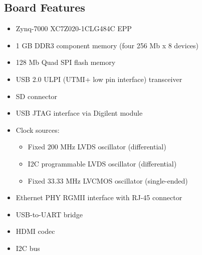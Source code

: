 \subsection{Board Features}
\label{zynq:features}
\nocite{Zynq7000:UserGuide}
\begin{itemize}
    \item Zynq-7000 XC7Z020-1CLG484C \gls{EPP}
    \item 1 GB \gls{DDR}3 component memory (four 256 Mb x 8 devices)
    \item 128 Mb Quad \gls{SPI} flash memory
    \item \gls{USB} 2.0 ULPI (UTMI+ low pin interface) transceiver
    \item \gls{SD} connector
    \item \gls{USB} \gls{JTAG} interface via Digilent module
    \item Clock sources:
    \begin{itemize}
        \item Fixed 200 MHz \gls{LVDS} oscillator (differential)
        \item \gls{I2C} programmable \gls{LVDS} oscillator (differential)
        \item Fixed 33.33 MHz \gls{LVCMOS} oscillator (single-ended)
    \end{itemize}
    \item Ethernet \gls{PHY} \gls{RGMII} interface with RJ-45 connector
    \item \gls{USB}-to-\gls{UART} bridge
    \item \gls{HDMI} codec
    \item \gls{I2C} bus


\end{itemize}
